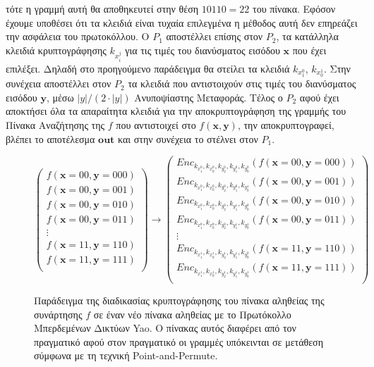 %
τότε η γραμμή αυτή θα αποθηκευτεί στην θέση $10110=22$ του πίνακα. Εφόσον έχουμε υποθέσει ότι τα κλειδιά είναι τυχαία επιλεγμένα η μέθοδος αυτή δεν επηρεάζει την ασφάλεια του πρωτοκόλλου. Ο $P_1$ αποστέλλει επίσης στον $P_2$, τα κατάλληλα κλειδιά κρυπτογράφησης $k_{x_i^j}$ για τις τιμές του διανύσματος εισόδου $\mathbf{x}$ που έχει επιλέξει. Δηλαδή στο προηγούμενο παράδειγμα θα στείλει τα κλειδιά $k_{x_1^0}$, $k_{x_0^1}$. Στην συνέχεια αποστέλλει στον $P_2$ τα κλειδιά που αντιστοιχούν στις τιμές του διανύσματος εισόδου $\mathbf{y}$, μέσω $|y|/(2 \cdot |y|)$ Ανυποψίαστης Μεταφοράς. Τέλος ο $P_2$ αφού έχει αποκτήσει όλα τα απαραίτητα κλειδιά για την αποκρυπτογράφηση της γραμμής του Πίνακα Αναζήτησης της $f$ που αντιστοιχεί στο $f(\mathbf{x}, \mathbf{y})$, την αποκρυπτογραφεί, βλέπει το αποτέλεσμα $\mathbf{out}$ και στην συνέχεια το στέλνει στον $P_1$.

\begin{figure}
    \centering
\[
    \begin{pmatrix}
        f(\mathbf{x}=00, \mathbf{y}=000)\\
        f(\mathbf{x}=00, \mathbf{y}=001)\\
        f(\mathbf{x}=00, \mathbf{y}=010)\\
        f(\mathbf{x}=00, \mathbf{y}=011)\\
        \vdots\\
        f(\mathbf{x}=11, \mathbf{y}=110)\\
        f(\mathbf{x}=11, \mathbf{y}=111)\\
    \end{pmatrix}
    \rightarrow
    \begin{pmatrix}
        Enc_{k_{x_1^0}, k_{x_0^0}, k_{y_2^0}, k_{y_1^0}, k_{y_0^0}}(f(\mathbf{x}=00, \mathbf{y}=000))\\
        Enc_{k_{x_1^0}, k_{x_0^0}, k_{y_2^0}, k_{y_1^0}, k_{y_0^1}}(f(\mathbf{x}=00, \mathbf{y}=001))\\
        Enc_{k_{x_1^0}, k_{x_0^0}, k_{y_2^0}, k_{y_1^1}, k_{y_0^0}}(f(\mathbf{x}=00, \mathbf{y}=010))\\
        Enc_{k_{x_1^0}, k_{x_0^0}, k_{y_2^0}, k_{y_1^1}, k_{y_0^1}}(f(\mathbf{x}=00, \mathbf{y}=011))\\
        \vdots\\
        Enc_{k_{x_1^1}, k_{x_0^1}, k_{y_2^1}, k_{y_1^1}, k_{y_0^0}}(f(\mathbf{x}=11, \mathbf{y}=110))\\
        Enc_{k_{x_1^1}, k_{x_0^1}, k_{y_2^1}, k_{y_1^1}, k_{y_0^1}}(f(\mathbf{x}=11, \mathbf{y}=111))\\
    \end{pmatrix}
\]
    \caption[Παράδειγμα της διαδικασίας κρυπτογράφησης του πίνακα αληθείας της συνάρτησης $f$ σε έναν νέο πίνακα αληθείας με το Πρωτόκολλο Μπερδεμένων Δικτύων Yao.]{Παράδειγμα της διαδικασίας κρυπτογράφησης του πίνακα αληθείας της συνάρτησης $f$ σε έναν νέο πίνακα αληθείας με το Πρωτόκολλο Μπερδεμένων Δικτύων Yao. Ο πίνακας αυτός διαφέρει από τον πραγματικό αφού στον πραγματικό οι γραμμές υπόκεινται σε μετάθεση σύμφωνα με τη τεχνική Point-and-Permute.}
    \label{fig:yaos-gc-global-truth-table}
\end{figure}

